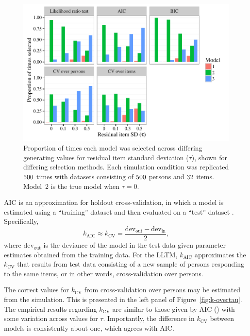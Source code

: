 \documentclass[12pt, letterpaper]{article}
\begin{document}
\begin{figure}[tbp]
	\centering
	\includegraphics{chapter_2/figs/select_overtau.pdf}
	\caption{Proportion of times each model was selected across differing generating values for residual item standard deviation ($\tau$), shown for differing selection methods. Each simulation condition was replicated $500$ times with datasets consisting of $500$ persons and $32$ items. Model~2 is the true model when $\tau = 0$.}
	\label{fig:select-overtau}
\end{figure}

AIC is an approximation for holdout cross-validation, in which a model is estimated using a ``training'' dataset and then evaluated on a ``test'' dataset 
.
Specifically,
\begin{equation}
	k_\mathrm{AIC} \approx k_\mathrm{CV} = \frac{\mathrm{dev_{out}} - \mathrm{dev_{in}}}{2}
,\end{equation}
where $\mathrm{dev_{out}}$ is the deviance of the model in the test data given parameter estimates obtained from the training data. 
For the LLTM, $k_\mathrm{AIC}$ approximates the $k_\mathrm{CV}$ that results from test data consisting of a new sample of persons responding to the same items, or in other words, cross-validation over persons. 

The correct values for $k_\mathrm{CV}$ from cross-validation over persons may be estimated from the simulation.
This is presented in the left panel of Figure~\ref{fig:k-overtau}. The empirical results regarding $k_\mathrm{CV}$ are similar to those given by AIC (\aic[and]) with some variation across values for $\tau$. Importantly, the difference in $k_\mathrm{CV}$ between models is consistently about one, which agrees with AIC.
\end{document}
